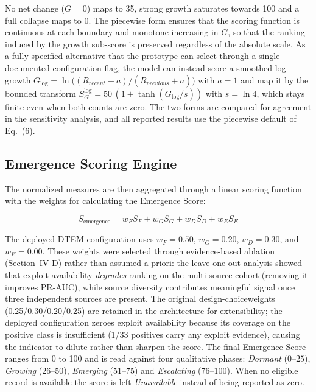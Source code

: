 \documentclass[conference]{IEEEtran}
\begin{document}
No net change ($G=0$) maps to 35, strong growth saturates towards 100 and a full collapse maps to 0. The piecewise form ensures that the scoring function is continuous at each boundary and monotone-increasing in $G$, so that the ranking induced by the growth sub-score is preserved regardless of the absolute scale. As a fully specified alternative that the prototype can select through a single documented configuration flag, the model can instead score a smoothed log-growth $G_{\log}=\ln\!\big((R_{recent}+a)/(R_{previous}+a)\big)$ with $a=1$ and map it by the bounded transform $S_G^{\log}=50\,(1+\tanh(G_{\log}/s))$ with $s=\ln 4$, which stays finite even when both counts are zero. The two forms are compared for agreement in the sensitivity analysis, and all reported results use the piecewise default of Eq.~(6).

\subsection{Emergence Scoring Engine}

The normalized measures are then aggregated through a linear scoring function with the weights for calculating the Emergence Score:

\begin{equation}
S_{\mathrm{emergence}} =
w_F S_F +
w_G S_G +
w_D S_D +
w_E S_E
\tag{7}
\end{equation}

The deployed DTEM configuration uses $w_F = 0.50$, $w_G = 0.20$, $w_D = 0.30$, and $w_E = 0.00$. These weights were selected through evidence-based ablation (Section~IV-D) rather than assumed a priori: the leave-one-out analysis showed that exploit availability \emph{degrades} ranking on the multi-source cohort (removing it improves PR-AUC), while source diversity contributes meaningful signal once three independent sources are present. The original design-choiceweights (0.25/0.30/0.20/0.25) are retained in the architecture for extensibility; the deployed configuration zeroes exploit availability because its coverage on the positive class is insufficient (1/33 positives carry any exploit evidence), causing the indicator to dilute rather than sharpen the score. The final Emergence Score ranges from 0 to 100 and is read against four qualitative phases: \textit{Dormant} ($0$--$25$), \textit{Growing} ($26$--$50$), \textit{Emerging} ($51$--$75$) and \textit{Escalating} ($76$--$100$). When no eligible record is available the score is left \textit{Unavailable} instead of being reported as zero.
\end{document}
